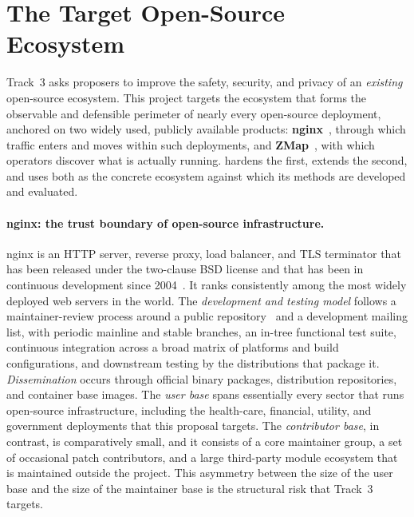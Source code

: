 \section{The Target Open-Source Ecosystem}
\label{sec:ecosystem}

Track~3 asks proposers to improve the safety, security, and privacy of an
\emph{existing} open-source ecosystem. This project targets the ecosystem
that forms the observable and defensible perimeter of nearly every
open-source deployment, anchored on two widely used, publicly available
products: \textbf{nginx}~\cite{nginx,nginxsrc}, through which traffic enters
and moves within such deployments, and \textbf{ZMap}~\cite{zmap,zmapsrc},
with which operators discover what is actually running. \sysname hardens the
first, extends the second, and uses both as the concrete ecosystem against
which its methods are developed and evaluated.

\paragraph{nginx: the trust boundary of open-source infrastructure.}
nginx is an HTTP server, reverse proxy, load balancer, and TLS terminator
that has been released under the two-clause BSD license and that has been in
continuous development since 2004~\cite{nginx}. It ranks consistently among
the most widely deployed web servers in the world. The
\emph{development and testing model} follows a maintainer-review process
around a public repository~\cite{nginxsrc} and a development mailing list,
with periodic mainline and stable branches, an in-tree functional test suite,
continuous integration across a broad matrix of platforms and build
configurations, and downstream testing by the distributions that package it.
\emph{Dissemination} occurs through official binary packages, distribution
repositories, and container base images. The \emph{user base} spans
essentially every sector that runs open-source infrastructure, including the
health-care, financial, utility, and government deployments that this
proposal targets. The \emph{contributor base}, in contrast, is comparatively
small, and it consists of a core maintainer group, a set of occasional patch
contributors, and a large third-party module ecosystem that is maintained
outside the project. This asymmetry between the size of the user base and the size of the
maintainer base is the structural risk that Track~3 targets.

